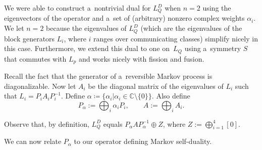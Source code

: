 \documentclass[10pt,a4paper]{amsart}
\numberwithin{equation}{section}
\theoremstyle{definition}
\def\mathcal#1{#1}
\begin{document}
We were able to construct a~nontrivial dual for $L_Q^D$ when $n=2$ using the eigenvectors of the operator and a~set of (arbitrary) nonzero complex weights $\alpha_i$. We let $n=2$ because the eigenvalues of $L_Q^D$ (which are the eigenvalues of the block generators $\mathcal{L}_i$, where $i$ ranges over communicating classes) simplify nicely in this case. Furthermore, we extend this dual to one on~$L_Q$ using a~symmetry $S$ that commutes with $L_p$ and works nicely with fission and fusion.

Recall the fact that the generator of a~reversible Markov process is diagonalizable. Now let $\mathcal{A}_i$ be the diagonal matrix of the eigenvalues of $\mathcal{L}_i$ such that $\mathcal{L}_i = \mathcal{P}_i \mathcal{A}_i \mathcal{P}^{-1}_i$. Define $\alpha \coloneqq \{\alpha_i | \alpha_i \in \mathbb{C} \setminus \{0\} \}$. Also define
\[\mathcal{P}_\alpha := \bigoplus_{i} \alpha_i \mathcal{P}_i,\qquad\mathcal{A} := \bigoplus_{i} \mathcal{A}_i.\]

Observe that, by definition, $L_Q^D$ equals $\mathcal{P}_\alpha \mathcal{A}\mathcal{P}_\alpha^{-1} \oplus \mathcal{Z}$, where $\mathcal{Z} := \bigoplus_{i=1}^4 [0]$.


We can now relate $\mathcal{P}_\alpha$ to our operator defining Markov self-duality.
\end{document}
